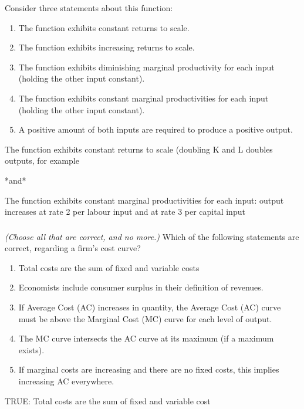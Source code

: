 \documentclass[]{article}
\begin{document}
Consider three statements about this function:

\begin{enumerate}
\def\labelenumi{\Alph{enumi}.}
\item
  The function exhibits constant returns to scale.
\item
  The function exhibits increasing returns to scale.
\item
  The function exhibits diminishing marginal productivity for each input
  (holding the other input constant).
\item
  The function exhibits constant marginal productivities for each input
  (holding the other input constant).
\item
  A positive amount of both inputs are required to produce a positive
  output.
\end{enumerate}

The function exhibits constant returns to scale (doubling K and L
doubles outputs, for example

*and*

The function exhibits constant marginal productivities for each input:
output increases at rate 2 per labour input and at rate 3 per capital
input

\hypertarget{section-16}{%
\subsubsection{}\label{section-16}}

\emph{(Choose all that are correct, and no more.)} Which of the
following statements are correct, regarding a firm's cost curve?

\begin{enumerate}
\def\labelenumi{\Alph{enumi}.}
\item
  Total costs are the sum of fixed and variable costs
\item
  Economists include consumer surplus in their definition of revenues.
\item
  If Average Cost (AC) increases in quantity, the Average Cost (AC)
  curve must be above the Marginal Cost (MC) curve for each level of
  output.
\item
  The MC curve intersects the AC curve at its maximum (if a maximum
  exists).
\item
  If marginal costs are increasing and there are no fixed costs, this
  implies increasing AC everywhere.
\end{enumerate}

TRUE: Total costs are the sum of fixed and variable cost
\end{document}
